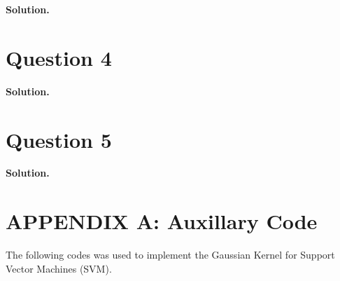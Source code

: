 \documentclass[11pt]{article}
\begin{document}
\textbf{Solution.}





\clearpage
\section*{Question 4}

\textbf{Solution.}





\clearpage
\section*{Question 5}

\textbf{Solution.}












\clearpage
\section*{APPENDIX A: Auxillary Code}

The following codes was used to implement the Gaussian Kernel for Support Vector Machines (SVM).





\end{document}
